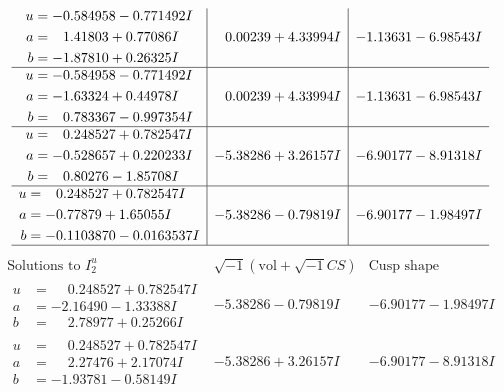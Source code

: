 \documentclass[1p]{elsarticle_modified}
\theoremstyle{definition}
\newcommand{\I}{\sqrt{-1}}
\begin{document}
$$\begin{array}{c|c|c}
\begin{aligned}
u &= -0.584958 - 0.771492 I \\
a &= \phantom{-}1.41803 + 0.77086 I \\
b &= -1.87810 + 0.26325 I\end{aligned}
 & \phantom{-}0.00239 + 4.33994 I & -1.13631 - 6.98543 I \\ \hline\begin{aligned}
u &= -0.584958 - 0.771492 I \\
a &= -1.63324 + 0.44978 I \\
b &= \phantom{-}0.783367 - 0.997354 I\end{aligned}
 & \phantom{-}0.00239 + 4.33994 I & -1.13631 - 6.98543 I \\ \hline\begin{aligned}
u &= \phantom{-}0.248527 + 0.782547 I \\
a &= -0.528657 + 0.220233 I \\
b &= \phantom{-}0.80276 - 1.85708 I\end{aligned}
 & -5.38286 + 3.26157 I & -6.90177 - 8.91318 I \\ \hline\begin{aligned}
u &= \phantom{-}0.248527 + 0.782547 I \\
a &= -0.77879 + 1.65055 I \\
b &= -0.1103870 - 0.0163537 I\end{aligned}
 & -5.38286 - 0.79819 I & -6.90177 - 1.98497 I\\
 \hline 
 \end{array}$$\newpage$$\begin{array}{c|c|c}  
\text{Solutions to }I^u_{2}& \I (\text{vol} + \sqrt{-1}CS) & \text{Cusp shape}\\
 \hline 
\begin{aligned}
u &= \phantom{-}0.248527 + 0.782547 I \\
a &= -2.16490 - 1.33388 I \\
b &= \phantom{-}2.78977 + 0.25266 I\end{aligned}
 & -5.38286 - 0.79819 I & -6.90177 - 1.98497 I \\ \hline\begin{aligned}
u &= \phantom{-}0.248527 + 0.782547 I \\
a &= \phantom{-}2.27476 + 2.17074 I \\
b &= -1.93781 - 0.58149 I\end{aligned}
 & -5.38286 + 3.26157 I & -6.90177 - 8.91318 I \\ \hline\begin{aligned}

\end{aligned}
\end{array}$$
\end{document}
